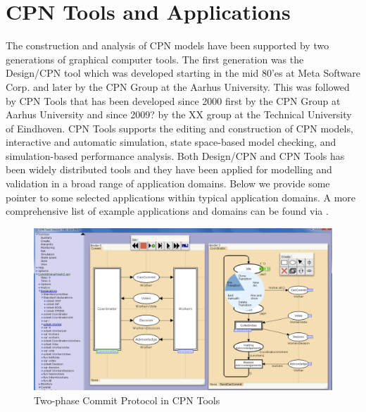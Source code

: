 
\section{CPN Tools and Applications}

The construction and analysis of CPN models have been supported by two
generations of graphical computer tools. The first generation was the
Design/CPN tool \cite{jensen:cpnmanual} which was developed starting
in the mid 80'es at Meta Software Corp. and later by the CPN Group at
the Aarhus University. This was followed by CPN Tools
\cite{cpntoolsweb} that has been developed since 2000 first by the CPN
Group at Aarhus University and since 2009? by the XX group at the
Technical University of Eindhoven. CPN Tools supports the editing and
construction of CPN models, interactive and automatic simulation,
state space-based model checking, and simulation-based performance
analysis. Both Design/CPN and CPN Tools has been widely distributed
tools and they have been applied for modelling and validation in a
broad range of application domains. Below we provide some pointer to
some selected applications within typical application domains. A more
comprehensive list of example applications and domains can be found
via \cite{cpnuse}.

\begin{figure}[b]
\centering
\includegraphics[width=\textwidth]{figures/cpntools.png}
\caption{Two-phase Commit Protocol in CPN Tools}
\label{fig:cpntools}
\end{figure}


